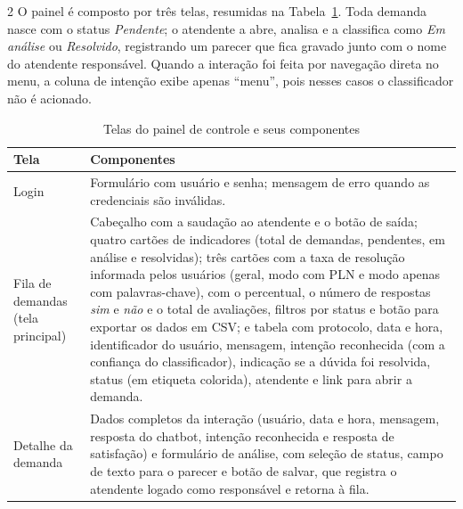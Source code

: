 \documentclass[10pt]{article}
\begin{document}
\begin{multicols}{2}
O painel é composto por três telas, resumidas na Tabela~\ref{tab:painel}.
Toda demanda nasce com o status \textit{Pendente}; o atendente a abre, analisa e
a classifica como \textit{Em análise} ou \textit{Resolvido}, registrando um
parecer que fica gravado junto com o nome do atendente responsável. Quando a
interação foi feita por navegação direta no menu, a coluna de intenção exibe
apenas ``menu'', pois nesses casos o classificador não é acionado.

\end{multicols}
\begin{table}[H]
  \centering
  \begin{tabular}{|p{}|p{}|}
    \hline
    \textbf{Tela} & \textbf{Componentes} \\ \hline
    Login & Formulário com usuário e senha; mensagem de erro quando as
    credenciais são inválidas. \\ \hline
    Fila de demandas (tela principal) &
    Cabeçalho com a saudação ao atendente e o botão de saída;
    quatro cartões de indicadores (total de demandas, pendentes, em análise e
    resolvidas); três cartões com a taxa de resolução informada pelos usuários
    (geral, modo com PLN e modo apenas com palavras-chave), com o percentual,
    o número de respostas \textit{sim} e \textit{não} e o total de avaliações,
    filtros por status e botão para exportar os dados em CSV; e tabela com
    protocolo, data e hora, identificador do usuário, mensagem, intenção
    reconhecida (com a confiança do classificador), indicação se a dúvida foi
    resolvida, status (em etiqueta colorida), atendente e link para abrir a
    demanda. \\ \hline
    Detalhe da demanda & Dados completos da interação (usuário, data e hora,
    mensagem, resposta do chatbot, intenção reconhecida e resposta de
    satisfação) e formulário de análise, com seleção de status, campo de texto
    para o parecer e botão de salvar, que registra o atendente logado como
    responsável e retorna à fila. \\ \hline
  \end{tabular}
  \caption{Telas do painel de controle e seus componentes}
  \label{tab:painel}
\end{table}
\begin{multicols}{2}

\IfFileExists{figures/painel_controle.png}{%
A Figura~\ref{fig:painel} apresenta a tela principal do painel.

\end{multicols}
\end{document}
